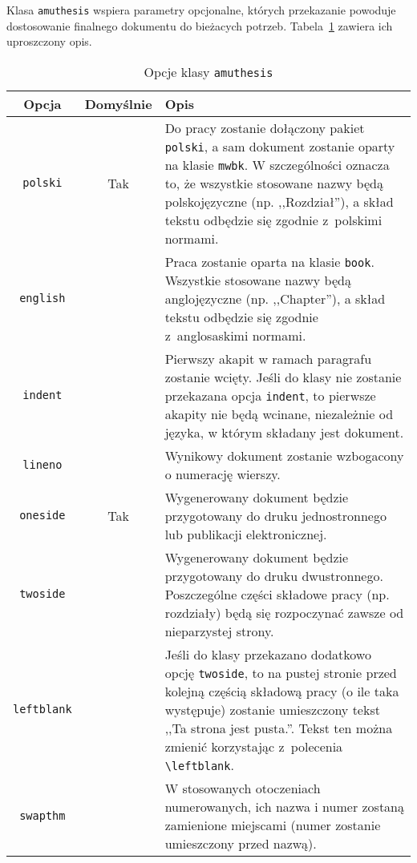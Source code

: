 \documentclass[oneside,polski]{amuthesis}
\begin{document}
Klasa \texttt{amuthesis} wspiera parametry opcjonalne, których przekazanie powoduje dostosowanie finalnego dokumentu do bieżacych potrzeb. Tabela~\ref{table:amuthesis-opcje} zawiera ich uproszczony opis.

\begin{table}[p]
  \caption{Opcje klasy \texttt{amuthesis}}
  \label{table:amuthesis-opcje}
  \begin{center}
  \begin{tabular}{ccp{9cm}}
    \toprule
    Opcja & Domyślnie & Opis\\
    \midrule
    \texttt{polski} & Tak & Do pracy zostanie dołączony pakiet \texttt{polski}, a sam dokument zostanie oparty na klasie \texttt{mwbk}. W szczególności oznacza to, że wszystkie stosowane nazwy będą polskojęzyczne (np. ,,Rozdział''), a skład tekstu odbędzie się zgodnie z~polskimi normami.\\
    \midrule
    \texttt{english} & & Praca zostanie oparta na klasie \texttt{book}. Wszystkie stosowane nazwy będą anglojęzyczne (np. ,,Chapter''), a skład tekstu odbędzie się zgodnie z~anglosaskimi normami.\\
    \midrule
    \texttt{indent} & & Pierwszy akapit w ramach paragrafu zostanie wcięty. Jeśli do klasy nie zostanie przekazana opcja \texttt{indent}, to pierwsze akapity nie będą wcinane, niezależnie od języka, w którym składany jest dokument.\\
    \midrule
    \texttt{lineno} & & Wynikowy dokument zostanie wzbogacony o numerację wierszy.\\
    \midrule
    \texttt{oneside} & Tak & Wygenerowany dokument będzie przygotowany do druku jednostronnego lub publikacji elektronicznej.\\
    \midrule
    \texttt{twoside} & & Wygenerowany dokument będzie przygotowany do druku dwustronnego. Poszczególne części składowe pracy (np. rozdziały) będą się rozpoczynać zawsze od nieparzystej strony.\\
    \midrule
    \texttt{leftblank} & & Jeśli do klasy przekazano dodatkowo opcję \texttt{twoside}, to na pustej stronie przed kolejną częścią składową pracy (o ile taka występuje) zostanie umieszczony tekst ,,Ta strona jest pusta.''. Tekst ten można zmienić korzystając z~polecenia \verb`\leftblank`.\\
    \midrule
    \texttt{swapthm} & & W stosowanych otoczeniach numerowanych, ich nazwa i numer zostaną zamienione miejscami (numer zostanie umieszczony przed nazwą).\\
    \bottomrule
  \end{tabular}
  \end{center}
\end{table}
\end{document}
